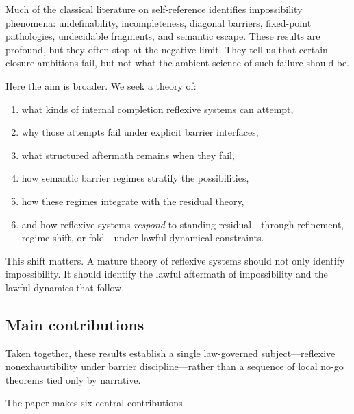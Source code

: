 \documentclass[11pt]{article}
\theoremstyle{plain}
\theoremstyle{definition}
\theoremstyle{remark}
\begin{document}
Much of the classical literature on self-reference identifies impossibility phenomena: undefinability, incompleteness, diagonal barriers, fixed-point pathologies, undecidable fragments, and semantic escape. These results are profound, but they often stop at the negative limit. They tell us that certain closure ambitions fail, but not what the ambient science of such failure should be.

Here the aim is broader. We seek a theory of:
\begin{enumerate}[label=(\arabic*)]
\item what kinds of internal completion reflexive systems can attempt,
\item why those attempts fail under explicit barrier interfaces,
\item what structured aftermath remains when they fail,
\item how semantic barrier regimes stratify the possibilities,
\item how these regimes integrate with the residual theory,
\item and how reflexive systems \emph{respond} to standing residual---through refinement, regime shift, or fold---under lawful dynamical constraints.
\end{enumerate}

This shift matters. A mature theory of reflexive systems should not only identify impossibility. It should identify the lawful aftermath of impossibility and the lawful dynamics that follow.

\subsection{Main contributions}

Taken together, these results establish a single law-governed subject---reflexive nonexhaustibility under barrier discipline---rather than a sequence of local no-go theorems tied only by narrative.

The paper makes six central contributions.
\end{document}
